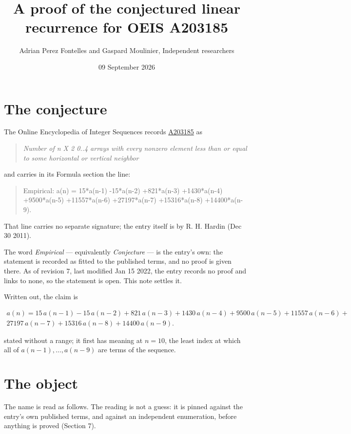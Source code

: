 \documentclass[11pt]{article}
\title{A proof of the conjectured linear recurrence for OEIS A203185}
\author{Adrian Perez Fontelles and Gaspard Moulinier, Independent researchers}
\date{09 September 2026}
\theoremstyle{definition}
\begin{document}
\maketitle
\section{The conjecture}

The Online Encyclopedia of Integer Sequences records \href{https://oeis.org/A203185}{A203185} as

\begin{quote}\itshape Number of n X 2 0..4 arrays with every nonzero element less than or equal to some horizontal or vertical neighbor\end{quote}

and carries in its Formula section the line:

\begin{quote}\ttfamily Empirical: a(n) = 15*a(n-1) -15*a(n-2) +821*a(n-3) +1430*a(n-4) +9500*a(n-5) +11557*a(n-6) +27197*a(n-7) +15316*a(n-8) +14400*a(n-9).\end{quote}

That line carries no separate signature; the entry itself is by R. H. Hardin (Dec 30 2011).

The word {\itshape Empirical} --- equivalently {\itshape Conjecture} --- is the entry's own: the statement is recorded as fitted to the published terms, and no proof is given there. As of revision 7, last modified Jan 15 2022, the entry records no proof and links to none, so the statement is open. This note settles it.

Written out, the claim is

\begin{multline*} a(n) = 15\,a(n-1) - 15\,a(n-2) + 821\,a(n-3) + 1430\,a(n-4) + 9500\,a(n-5) + 11557\,a(n-6) + \\ 27197\,a(n-7) + 15316\,a(n-8) + 14400\,a(n-9). \end{multline*}

stated without a range; it first has meaning at $n = 10$, the least index at which all of $a(n-1),\dots,a(n-9)$ are terms of the sequence.

\section{The object}

The name is read as follows. The reading is not a guess: it is pinned against the entry's own published terms, and against an independent enumeration, before anything is proved (Section 7).
\end{document}
